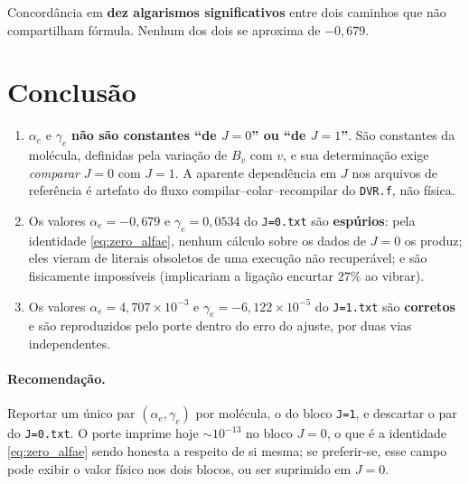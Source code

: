 \documentclass[11pt,a4paper]{article}
\newcommand{\alfae}{\alpha_e}
\newcommand{\gamae}{\gamma_e}
\begin{document}
\noindent
Concordância em \textbf{dez algarismos significativos} entre dois caminhos que
não compartilham fórmula. Nenhum dos dois se aproxima de $-0{,}679$.

\section{Conclusão}

\begin{enumerate}
\item $\alfae$ e $\gamae$ \textbf{não são constantes ``de $J=0$'' ou ``de
      $J=1$''}. São constantes da molécula, definidas pela variação de $B_v$ com
      $v$, e sua determinação exige \emph{comparar} $J=0$ com $J=1$. A aparente
      dependência em $J$ nos arquivos de referência é artefato do fluxo
      compilar--colar--recompilar do \texttt{DVR.f}, não física.
\item Os valores $\alfae = -0{,}679$ e $\gamae = 0{,}0534$ do \texttt{J=0.txt}
      são \textbf{espúrios}: pela identidade \eqref{eq:zero_alfae}, nenhum
      cálculo sobre os dados de $J=0$ os produz; eles vieram de literais
      obsoletos de uma execução não recuperável; e são fisicamente impossíveis
      (implicariam a ligação encurtar $27\%$ ao vibrar).
\item Os valores $\alfae = 4{,}707{\times}10^{-3}$ e
      $\gamae = -6{,}122{\times}10^{-5}$ do \texttt{J=1.txt} são
      \textbf{corretos} e são reproduzidos pelo porte dentro do erro do ajuste,
      por duas vias independentes.
\end{enumerate}

\paragraph{Recomendação.} Reportar um único par $(\alfae,\gamae)$ por molécula,
o do bloco \texttt{J=1}, e descartar o par do \texttt{J=0.txt}. O porte imprime
hoje $\sim\!10^{-13}$ no bloco $J=0$, o que é a identidade
\eqref{eq:zero_alfae} sendo honesta a respeito de si mesma; se preferir-se, esse
campo pode exibir o valor físico nos dois blocos, ou ser suprimido em $J=0$.
\end{document}
